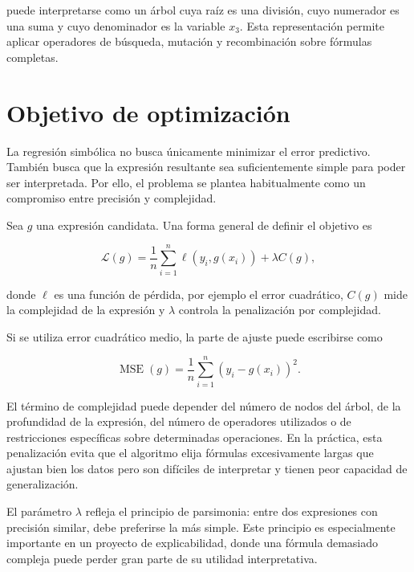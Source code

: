 puede interpretarse como un árbol cuya raíz es una división, cuyo numerador es una suma y cuyo denominador es la variable \(x_3\). Esta representación permite aplicar operadores de búsqueda, mutación y recombinación sobre fórmulas completas.

\section{Objetivo de optimización}

La regresión simbólica no busca únicamente minimizar el error predictivo. También busca que la expresión resultante sea suficientemente simple para poder ser interpretada. Por ello, el problema se plantea habitualmente como un compromiso entre precisión y complejidad.

Sea \(g\) una expresión candidata. Una forma general de definir el objetivo es

\begin{equation}
\mathcal{L}(g)
=
\frac{1}{n}
\sum_{i=1}^{n}
\ell
\left(
y_i,
g(x_i)
\right)
+
\lambda C(g),
\label{eq:symbolic-objective}
\end{equation}

donde \(\ell\) es una función de pérdida, por ejemplo el error cuadrático, \(C(g)\) mide la complejidad de la expresión y \(\lambda\) controla la penalización por complejidad.

Si se utiliza error cuadrático medio, la parte de ajuste puede escribirse como

\begin{equation}
\operatorname{MSE}(g)
=
\frac{1}{n}
\sum_{i=1}^{n}
\left(
y_i - g(x_i)
\right)^2.
\label{eq:symbolic-mse}
\end{equation}

El término de complejidad puede depender del número de nodos del árbol, de la profundidad de la expresión, del número de operadores utilizados o de restricciones específicas sobre determinadas operaciones. En la práctica, esta penalización evita que el algoritmo elija fórmulas excesivamente largas que ajustan bien los datos pero son difíciles de interpretar y tienen peor capacidad de generalización.

El parámetro \(\lambda\) refleja el principio de parsimonia: entre dos expresiones con precisión similar, debe preferirse la más simple. Este principio es especialmente importante en un proyecto de explicabilidad, donde una fórmula demasiado compleja puede perder gran parte de su utilidad interpretativa.

